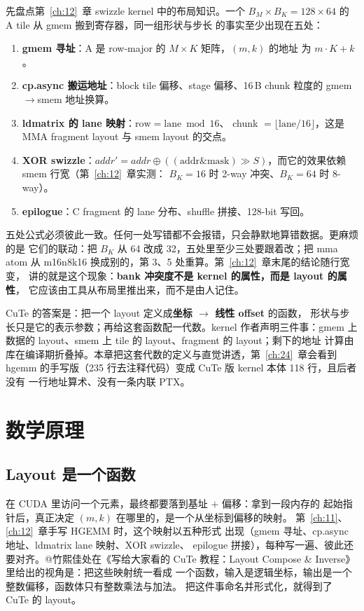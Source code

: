 先盘点第~\ref{ch:12}~章 swizzle kernel 中的布局知识。一个
$B_M\times B_K = 128\times64$ 的 A tile 从 gmem 搬到寄存器，同一组形状与步长
的事实至少出现在五处：

\begin{enumerate}
  \item \textbf{gmem 寻址}：A 是 row-major 的 $M\times K$ 矩阵，$(m,k)$ 的地址
        为 $m\cdot K+k$。
  \item \textbf{cp.async 搬运地址}：block tile 偏移、stage 偏移、16\,B chunk
        粒度的 gmem$\to$smem 地址换算。
  \item \textbf{ldmatrix 的 lane 映射}：$\mathrm{row}=\mathrm{lane}\bmod16$、
        chunk $=\lfloor\mathrm{lane}/16\rfloor$，这是 MMA fragment layout 与
        smem layout 的交点。
  \item \textbf{XOR swizzle}：$addr' = addr \oplus ((\mathrm{addr} \mathbin{\&}
        \mathrm{mask}) \gg S)$，而它的效果依赖 smem 行宽（第~\ref{ch:12}~章实测：
        $B_K{=}16$ 时 2-way 冲突、$B_K{=}64$ 时 8-way）。
  \item \textbf{epilogue}：C fragment 的 lane 分布、shuffle 拼接、128-bit 写回。
\end{enumerate}

五处公式必须彼此一致。任何一处写错都不会报错，只会静默地算错数据。更麻烦的是
它们的联动：把 $B_K$ 从 64 改成 32，五处里至少三处要跟着改；把 mma atom 从
m16n8k16 换成别的，第 3、5 处重算。第~\ref{ch:12}~章末尾的结论随行宽变，
讲的就是这个现象：\textbf{bank 冲突度不是 kernel 的属性，而是 layout 的属性}，
它应该由工具从布局里推出来，而不是由人记住。

CuTe 的答案是：把一个 layout 定义成\textbf{坐标 $\to$ 线性 offset} 的函数，
形状与步长只是它的表示参数；再给这套函数配一代数。kernel 作者声明三件事：gmem
上数据的 layout、smem 上 tile 的 layout、fragment 的 layout；剩下的地址
计算由库在编译期折叠掉。本章把这套代数的定义与直觉讲透，第~\ref{ch:24}~章会看到
hgemm 的手写版（235 行去注释代码）变成 CuTe 版 kernel 本体 118 行，且后者没有
一行地址算术、没有一条内联 PTX。

\section{数学原理}

\subsection{Layout 是一个函数}

在 CUDA 里访问一个元素，最终都要落到基址 $+$ 偏移：拿到一段内存的
起始指针后，真正决定 $(m,k)$ 在哪里的，是一个从坐标到偏移的映射。
第~\ref{ch:11}、\ref{ch:12}~章手写 HGEMM 时，这个映射以五种形式
出现（gmem 寻址、cp.async 地址、ldmatrix lane 映射、XOR swizzle、
epilogue 拼接），每种写一遍、彼此还要对齐。@竹熙佳处在《写给大家看的
CuTe 教程：Layout Compose \& Inverse》里给出的视角是：把这些映射统一看成
一个函数，输入是逻辑坐标，输出是一个整数偏移，函数体只有整数乘法与加法。
把这件事命名并形式化，就得到了 CuTe 的 layout。

